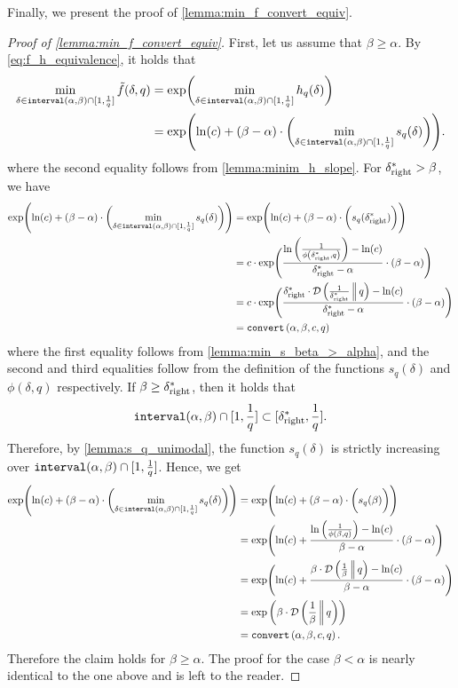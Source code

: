 \documentclass[letterpaper,11pt]{article}
\newcommand{\1}[1]{\mathds{1}\left[#1\right]}
\newcommand{\runtime}[1][\alpha, \beta, c, q]{\textnormal{\texttt{convert}}\left(#1\right)}
\newcommand{\D}[2]{\mathcal{D}\left(#1\, \middle\|\,#2 \right)}
\newcommand{\goodd}{\textnormal{\texttt{interval}}(\alpha, \beta)}
\newcommand{\sdeltar}{\delta^{*}_{\textnormal{right}}}
\begin{document}
Finally, we present the proof of \cref{lemma:min_f_convert_equiv}.

\begin{proof}[Proof of \cref{lemma:min_f_convert_equiv}]
	First, let us assume that $\beta \geq \alpha$.
	By \eqref{eq:f_h_equivalence}, it holds that
	\begin{align}
		\min_{\delta \in \goodd \cap [1,\frac{1}{q}]} \tilde{f}(\delta,q) &= \exp\biggl(\min_{\delta \in \goodd \cap [1,\frac{1}{q}]} h_{q}(\delta)\biggr) \notag\\
										  &= \exp\Biggl(\ln(c) + (\beta - \alpha) \cdot \biggl(\min_{\delta \in \goodd \cap [1,\frac{1}{q}]} s_q(\delta)\biggr)\Biggr).			\label{eq:tilde_f_s_q_equiv}
	\end{align}
	where the second equality follows from \cref{lemma:minim_h_slope}.
	 For $\sdeltar > \beta$, we have
	\begin{align*}
		  \exp\Biggl(\ln(c) + (\beta - \alpha) \cdot \biggl(\min_{\delta \in \goodd \cap [1,\frac{1}{q}]} s_q(\delta)\biggr)\Biggr) &=  \exp\Biggl(\ln(c) + (\beta - \alpha) \cdot \biggl(s_{q}(\sdeltar)\biggr)\Biggr)\\
&= c \cdot \exp\Biggl(\frac{\ln\left( \frac{1}{\phi\left( \sdeltar, q \right) } \right) - \ln(c) }{\sdeltar - \alpha} \cdot \left( \beta - \alpha \right) \Biggr)\\
&= c \cdot \exp\Biggl(\frac{\sdeltar\cdot \D{\frac{1}{\sdeltar}}{q} - \ln(c) }{\sdeltar - \alpha} \cdot \left( \beta - \alpha \right) \Biggr)\\
&= \runtime
	\end{align*}
	where the first equality follows from \cref{lemma:min_s_beta_>_alpha}, and the second and third equalities follow from the definition of the functions $s_{q}(\delta)$ and $\phi(\delta, q)$ respectively. If $\beta \geq \sdeltar$, then it holds that
	\begin{equation*}
		\goodd \cap [1,\frac{1}{q}] \subset [\sdeltar, \frac{1}{q}].
	\end{equation*}
	Therefore, by \cref{lemma:s_q_unimodal}, the function $s_q(\delta)$ is strictly increasing over $\goodd \cap [1,\frac{1}{q}]$.
	Hence, we get
	\begin{align*}
		\exp\Biggl(\ln(c) + (\beta - \alpha) \cdot \biggl(\min_{\delta \in \goodd \cap [1,\frac{1}{q}]} s_q(\delta)\biggr)\Biggr) &=  \exp\Biggl(\ln(c) + (\beta - \alpha) \cdot \biggl(s_{q}(\beta)\biggr)\Biggr)\\
																	  &= \exp\Biggl(\ln(c) + \frac{\ln\left( \frac{1}{\phi\left( \beta, q \right) } \right) - \ln(c) }{\beta - \alpha} \cdot \left( \beta - \alpha \right) \Biggr)\\
																	  &= \exp\Biggl(\ln(c) +\frac{\beta\cdot \D{\frac{1}{\beta}}{q} - \ln(c) }{\beta  - \alpha} \cdot \left( \beta - \alpha \right) \Biggr)\\
																	  &= \exp\left(\beta\cdot \D{\frac{1}{\beta}}{q}\right)\\
																	  &= \runtime.
	\end{align*}
	Therefore the claim holds for $\beta \geq \alpha$. The proof for the case $\beta < \alpha$ is nearly identical to the one above and is left to the reader.
\end{proof}
\end{document}
